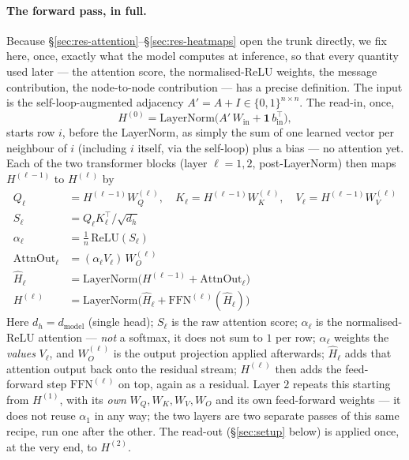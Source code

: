 \documentclass[11pt,a4paper]{article}
\begin{document}
\paragraph{The forward pass, in full.} Because \S\ref{sec:res-attention}--\S\ref{sec:res-heatmaps}
open the trunk directly, we fix here, once, exactly what the model computes at inference, so that
every quantity used later --- the attention score, the normalised-ReLU weights, the message
contribution, the node-to-node contribution --- has a precise definition. The input is the
self-loop-augmented adjacency $A'=A+I\in\{0,1\}^{n\times n}$. The read-in, once,
\[ H^{(0)} = \mathrm{LayerNorm}\big(A'\,W_{\mathrm{in}} + \mathbf 1\, b_{\mathrm{in}}^\top\big), \]
starts row $i$, before the LayerNorm, as simply the sum of one learned vector per neighbour of
$i$ (including $i$ itself, via the self-loop) plus a bias --- no attention yet. Each of the two
transformer blocks (layer $\ell=1,2$, post-LayerNorm) then maps $H^{(\ell-1)}$ to $H^{(\ell)}$ by
\begin{align*}
Q_\ell &= H^{(\ell-1)}W_Q^{(\ell)}, \quad K_\ell = H^{(\ell-1)}W_K^{(\ell)}, \quad
V_\ell = H^{(\ell-1)}W_V^{(\ell)}\\[2pt]
S_\ell &= Q_\ell K_\ell^\top/\sqrt{d_h}\\[2pt]
\alpha_\ell &= \tfrac1n\,\mathrm{ReLU}(S_\ell)\\[2pt]
\mathrm{AttnOut}_\ell &= (\alpha_\ell V_\ell)\,W_O^{(\ell)}\\[2pt]
\widehat H_\ell &= \mathrm{LayerNorm}\big(H^{(\ell-1)}+\mathrm{AttnOut}_\ell\big)\\[2pt]
H^{(\ell)} &= \mathrm{LayerNorm}\big(\widehat H_\ell + \mathrm{FFN}^{(\ell)}(\widehat H_\ell)\big)
\end{align*}
Here $d_h=d_{\mathrm{model}}$ (single head); $S_\ell$ is the raw attention score; $\alpha_\ell$
is the normalised-ReLU attention --- \emph{not} a softmax, it does not sum to $1$ per row;
$\alpha_\ell$ weights the \emph{values} $V_\ell$, and $W_O^{(\ell)}$ is the output projection
applied afterwards; $\widehat H_\ell$ adds that attention output back onto the residual stream;
$H^{(\ell)}$ then adds the feed-forward step $\mathrm{FFN}^{(\ell)}$ on top, again as a residual.
Layer $2$ repeats this starting from $H^{(1)}$, with its \emph{own} $W_Q,W_K,W_V,W_O$ and its own
feed-forward weights --- it does not reuse $\alpha_1$ in any way; the two layers are two separate
passes of this same recipe, run one after the other. The read-out (\S\ref{sec:setup} below) is
applied once, at the very end, to $H^{(2)}$.
\end{document}
